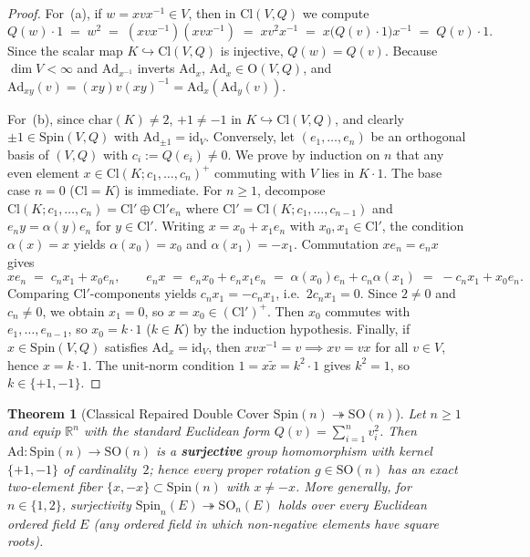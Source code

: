 \documentclass[11pt]{article}
\newtheorem{theorem}{Theorem}[section]
\theoremstyle{definition}
\theoremstyle{remark}
\newcommand{\Cl}{\mathrm{Cl}}
\newcommand{\Spin}{\mathrm{Spin}}
\newcommand{\Ad}{\mathrm{Ad}}
\newcommand{\SO}{\mathrm{SO}}
\newcommand{\Orth}{\mathrm{O}}
\newcommand{\id}{\mathrm{id}}
\begin{document}
\begin{proof}
For~(a), if $w = x v x^{-1} \in V$, then in $\Cl(V,Q)$ we compute
\[
Q(w) \cdot 1 \;=\; w^2 \;=\; (x v x^{-1})(x v x^{-1}) \;=\; x v^2 x^{-1} \;=\; x\bigl(Q(v) \cdot 1\bigr)x^{-1} \;=\; Q(v) \cdot 1.
\]
Since the scalar map $K \hookrightarrow \Cl(V,Q)$ is injective, $Q(w) = Q(v)$. Because $\dim V < \infty$ and $\Ad_{x^{-1}}$ inverts $\Ad_x$, $\Ad_x \in \Orth(V,Q)$, and $\Ad_{xy}(v) = (xy)v(xy)^{-1} = \Ad_x(\Ad_y(v))$.

For~(b), since $\mathrm{char}(K) \ne 2$, $+1 \ne -1$ in $K \hookrightarrow \Cl(V,Q)$, and clearly $\pm 1 \in \Spin(V,Q)$ with $\Ad_{\pm 1} = \id_V$. Conversely, let $(e_1, \dots, e_n)$ be an orthogonal basis of $(V,Q)$ with $c_i := Q(e_i) \ne 0$. We prove by induction on $n$ that any even element $x \in \Cl(K; c_1, \dots, c_n)^+$ commuting with $V$ lies in $K \cdot 1$. The base case $n = 0$ ($\Cl = K$) is immediate. For $n \ge 1$, decompose $\Cl(K; c_1, \dots, c_n) = \Cl' \oplus \Cl' e_n$ where $\Cl' = \Cl(K; c_1, \dots, c_{n-1})$ and $e_n y = \alpha(y) e_n$ for $y \in \Cl'$. Writing $x = x_0 + x_1 e_n$ with $x_0, x_1 \in \Cl'$, the condition $\alpha(x) = x$ yields $\alpha(x_0) = x_0$ and $\alpha(x_1) = -x_1$. Commutation $x e_n = e_n x$ gives
\[
x e_n \;=\; c_n x_1 + x_0 e_n, \qquad e_n x \;=\; e_n x_0 + e_n x_1 e_n \;=\; \alpha(x_0) e_n + c_n \alpha(x_1) \;=\; -c_n x_1 + x_0 e_n.
\]
Comparing $\Cl'$-components yields $c_n x_1 = -c_n x_1$, i.e.\ $2 c_n x_1 = 0$. Since $2 \ne 0$ and $c_n \ne 0$, we obtain $x_1 = 0$, so $x = x_0 \in (\Cl')^+$. Then $x_0$ commutes with $e_1, \dots, e_{n-1}$, so $x_0 = k \cdot 1$ ($k \in K$) by the induction hypothesis. Finally, if $x \in \Spin(V,Q)$ satisfies $\Ad_x = \id_V$, then $x v x^{-1} = v \implies x v = v x$ for all $v \in V$, hence $x = k \cdot 1$. The unit-norm condition $1 = x \widetilde{x} = k^2 \cdot 1$ gives $k^2 = 1$, so $k \in \{+1, -1\}$.
\end{proof}

\begin{theorem}[Classical Repaired Double Cover $\Spin(n) \twoheadrightarrow \SO(n)$]\label{thm:repaired-positive}
Let $n \ge 1$ and equip $\mathbb{R}^n$ with the standard Euclidean form $Q(v) = \sum_{i=1}^n v_i^2$. Then $\Ad : \Spin(n) \to \SO(n)$ is a \textbf{surjective} group homomorphism with kernel $\{+1, -1\}$ of cardinality~$2$; hence every proper rotation $g \in \SO(n)$ has an exact two-element fiber $\{x, -x\} \subset \Spin(n)$ with $x \ne -x$. More generally, for $n \in \{1, 2\}$, surjectivity $\Spin_n(E) \twoheadrightarrow \SO_n(E)$ holds over every Euclidean ordered field $E$ (any ordered field in which non-negative elements have square roots).
\end{theorem}
\end{document}

